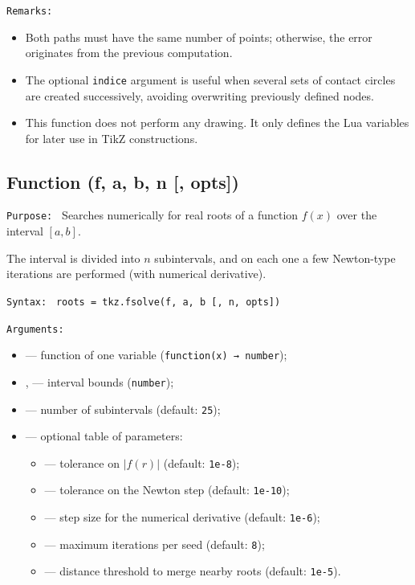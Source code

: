\texttt{Remarks: }
\begin{itemize}
  \item Both paths must have the same number of points; otherwise, the error originates from the previous computation.
  \item The optional \verb|indice| argument is useful when several sets of contact circles are created successively, avoiding overwriting previously defined nodes.
  \item This function does not perform any drawing. It only defines the Lua variables for later use in TikZ constructions.
\end{itemize}

\subsection{Function (f, a, b, n [, opts])}
\label{sub:fsolve}

\texttt{Purpose: }
Searches numerically for real roots of a function \( f(x) \) over the interval \([a,b]\).

The interval is divided into \( n \) subintervals, and on each one a few Newton-type iterations are performed (with numerical derivative).

\medskip
\texttt{Syntax: }
\verb|roots = tkz.fsolve(f, a, b [, n, opts])|

\medskip
\texttt{Arguments:}
\begin{itemize}
  \item {} — function of one variable (\texttt{function(x) → number});
  \item {},  — interval bounds (\texttt{number});
  \item {} — number of subintervals (default: \texttt{25});
  \item {} — optional table of parameters:
  \begin{itemize}
    \item {} — tolerance on \(|f(r)|\) (default: \texttt{1e-8});
    \item {} — tolerance on the Newton step (default: \texttt{1e-10});
    \item {} — step size for the numerical derivative (default: \texttt{1e-6});
    \item {} — maximum iterations per seed (default: \texttt{8});
    \item {} — distance threshold to merge nearby roots (default: \texttt{1e-5}).
  \end{itemize}
\end{itemize}


